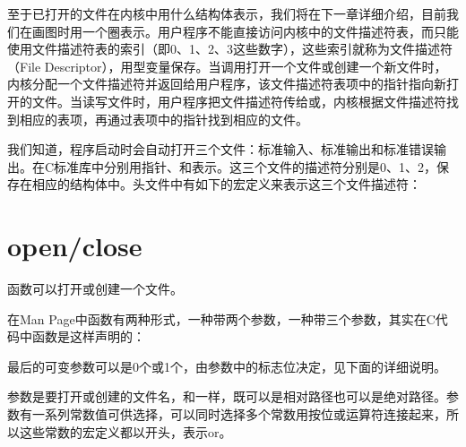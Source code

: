 

至于已打开的文件在内核中用什么结构体表示，我们将在下一章详细介绍，目前我们在画图时用一个圈表示。用户程序不能直接访问内核中的文件描述符表，而只能使用文件描述符表的索引（即0、1、2、3这些数字），这些索引就称为文件描述符（File Descriptor），用型变量保存。当调用打开一个文件或创建一个新文件时，内核分配一个文件描述符并返回给用户程序，该文件描述符表项中的指针指向新打开的文件。当读写文件时，用户程序把文件描述符传给或，内核根据文件描述符找到相应的表项，再通过表项中的指针找到相应的文件。



我们知道，程序启动时会自动打开三个文件：标准输入、标准输出和标准错误输出。在C标准库中分别用指针、和表示。这三个文件的描述符分别是0、1、2，保存在相应的结构体中。头文件中有如下的宏定义来表示这三个文件描述符：






\section{open/close}
%
函数可以打开或创建一个文件。




在Man Page中函数有两种形式，一种带两个参数，一种带三个参数，其实在C代码中函数是这样声明的：




最后的可变参数可以是0个或1个，由参数中的标志位决定，见下面的详细说明。



参数是要打开或创建的文件名，和一样，既可以是相对路径也可以是绝对路径。参数有一系列常数值可供选择，可以同时选择多个常数用按位或运算符连接起来，所以这些常数的宏定义都以开头，表示or。



